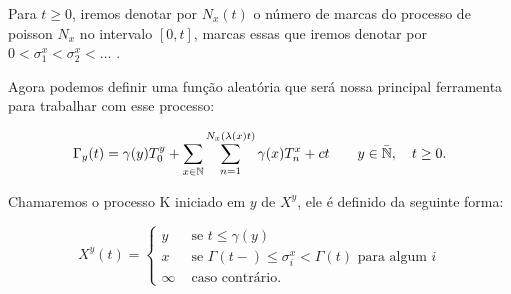 Para $t \geq 0$, iremos denotar por $N_x(t)$ o número de marcas do
processo de poisson  $N_x$ no intervalo $[0, t]$, marcas essas que
iremos denotar por $0 < \sigma_1^x < \sigma_2^x < \ldots$ .

Agora podemos definir uma função aleatória que será nossa principal
ferramenta para trabalhar com esse processo:

\begin{equation}
  \Gamma_y (t) = \gamma(y) T_0^y
                 + \sum_{x \in {\mathbb{N}}} \sum_{n = 1}^{N_x( \lambda (x) t)}
                       \gamma(x) T_n^x
                 + ct
  \qquad y \in {\bar{{\mathbb{N}}}}, \quad t \geq 0.
\end{equation}

Chamaremos o processo K iniciado em $y$ de $X^y$, ele é definido
da seguinte forma:

\begin{equation}
  X^y (t) =
  \begin{cases}
    y & \textrm{ se }  t \leq \gamma(y) \\
    x & \textrm{ se }  \Gamma(t-) \leq \sigma^x_i < \Gamma(t)
       \textrm{ para algum } i \\
    \infty & \textrm{ caso contrário.}
  \end{cases}
\end{equation}


